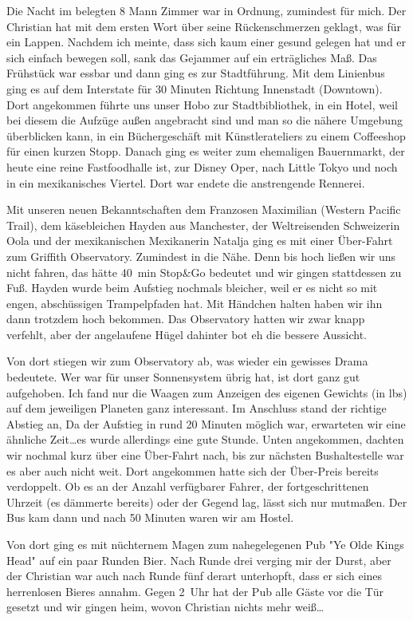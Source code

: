 Die Nacht im belegten 8 Mann Zimmer war in Ordnung, zumindest für mich.
Der Christian hat mit dem ersten Wort über seine Rückenschmerzen geklagt, was für ein Lappen.
Nachdem ich meinte, dass sich kaum einer gesund gelegen hat und er sich einfach bewegen soll, sank das Gejammer auf ein erträgliches Maß.
Das Frühstück war essbar und dann ging es zur Stadtführung.
Mit dem Linienbus ging es auf dem Interstate für 30 Minuten Richtung Innenstadt (Downtown).
Dort angekommen führte uns unser Hobo zur Stadtbibliothek, in ein Hotel, weil bei diesem die Aufzüge außen angebracht sind und man so die nähere Umgebung überblicken kann, in ein Büchergeschäft mit Künstlerateliers zu einem Coffeeshop für einen kurzen Stopp.
Danach ging es weiter zum ehemaligen Bauernmarkt, der heute eine reine Fastfoodhalle ist, zur Disney Oper, nach Little Tokyo und noch in ein mexikanisches Viertel.
Dort war endete die anstrengende Rennerei.

Mit unseren neuen Bekanntschaften dem Franzosen Maximilian (Western Pacific Trail), dem käsebleichen Hayden aus Manchester, der Weltreisenden Schweizerin Oola und der mexikanischen Mexikanerin Natalja ging es mit einer Über-Fahrt zum Griffith Observatory.
Zumindest in die Nähe.
Denn bis hoch ließen wir uns nicht fahren, das hätte 40~min Stop\&Go bedeutet und wir gingen stattdessen zu Fuß.
Hayden wurde beim Aufstieg nochmals bleicher, weil er es nicht so mit engen, abschüssigen Trampelpfaden hat.
Mit Händchen halten haben wir ihn dann trotzdem hoch bekommen.
Das Observatory hatten wir zwar knapp verfehlt, aber der angelaufene Hügel dahinter bot eh die bessere Aussicht.

Von dort stiegen wir zum Observatory ab, was wieder ein gewisses Drama bedeutete.
Wer war für unser Sonnensystem übrig hat, ist dort ganz gut aufgehoben.
Ich fand nur die Waagen zum Anzeigen des eigenen Gewichts (in lbs) auf dem jeweiligen Planeten ganz interessant.
Im Anschluss stand der richtige Abstieg an,
Da der Aufstieg in rund 20 Minuten möglich war, erwarteten wir eine ähnliche Zeit\dots es wurde allerdings eine gute Stunde.
Unten angekommen, dachten wir nochmal kurz über eine Über-Fahrt nach, bis zur nächsten Bushaltestelle war es aber auch nicht weit.
Dort angekommen hatte sich der Über-Preis bereits verdoppelt.
Ob es an der Anzahl verfügbarer Fahrer, der fortgeschrittenen Uhrzeit (es dämmerte bereits) oder der Gegend lag, lässt sich nur mutmaßen.
Der Bus kam dann und nach 50 Minuten waren wir am Hostel.

Von dort ging es mit nüchternem Magen zum nahegelegenen Pub "Ye Olde Kings Head" auf ein paar Runden Bier.
Nach Runde drei verging mir der Durst, aber der Christian war auch nach Runde fünf derart unterhopft, dass er sich eines herrenlosen Bieres annahm.
Gegen 2~Uhr hat der Pub alle Gäste vor die Tür gesetzt und wir gingen heim, wovon Christian nichts mehr weiß\dots